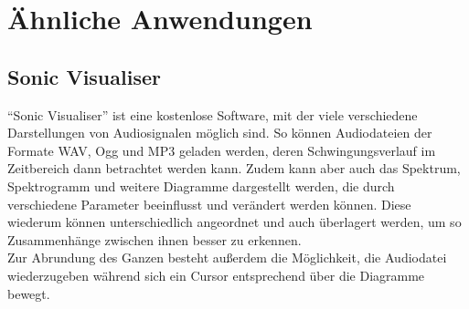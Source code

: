 \documentclass[a4paper]{article}
\begin{document}

\newpage
\section{Ähnliche Anwendungen}\label{sec:ähnlicheAnwendungen}

\subsection{Sonic Visualiser}\label{subsec:sonicVisualiser}
"`Sonic Visualiser"' ist eine kostenlose Software, mit der viele verschiedene Darstellungen von Audiosignalen möglich sind.
So können Audiodateien der Formate WAV, Ogg und MP3 geladen werden, deren Schwingungsverlauf im Zeitbereich dann betrachtet werden kann. Zudem kann aber auch das Spektrum, Spektrogramm und weitere Diagramme dargestellt werden, die durch verschiedene Parameter beeinflusst und verändert werden können. Diese wiederum können unterschiedlich angeordnet und auch überlagert werden, um so Zusammenhänge zwischen ihnen besser zu erkennen.\\
Zur Abrundung des Ganzen besteht außerdem die Möglichkeit, die Audiodatei wiederzugeben während sich ein Cursor entsprechend über die Diagramme bewegt.
\vspace{2em}
\end{document}
